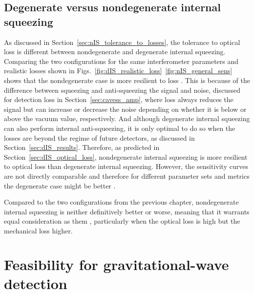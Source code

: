 \subsection{Degenerate versus nondegenerate internal squeezing}

As discussed in Section~\ref{sec:nIS_tolerance_to_losses}, the tolerance to optical loss is different between nondegenerate and degenerate internal squeezing. Comparing the two configurations for the same interferometer parameters and realistic losses shown in Figs.~\ref{fig:dIS_realistic_loss}~\ref{fig:nIS_general_sens}  shows that the nondegenerate case is more resilient to loss . 
This is because of the difference between squeezing and anti-squeezing the signal and noise, discussed for detection loss in Section~\ref{sec:cavess_amp}, where loss always reduces the signal but can increase or decrease the noise depending on whether it is below or above the vacuum value, respectively. And although degenerate internal squeezing can also perform internal anti-squeezing, it is only optimal to do so when the losses are beyond the regime of future detectors, as discussed in Section~\ref{sec:dIS_results}. 
Therefore, as predicted in Section~\ref{sec:dIS_optical_loss}, nondegenerate internal squeezing is more resilient to optical loss than degenerate internal squeezing. However, the sensitivity curves are not directly comparable and therefore for different parameter sets and metrics the degenerate case might be better . %


Compared to the two configurations from the previous chapter, nondegenerate internal squeezing is neither definitively better or worse, meaning that it warrants equal consideration as them , particularly when the optical loss is high but the mechanical loss higher.


\section{Feasibility for gravitational-wave detection}

